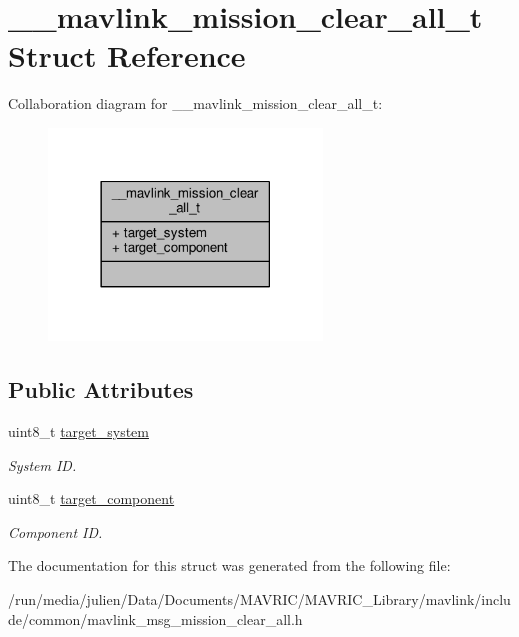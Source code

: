 \hypertarget{struct____mavlink__mission__clear__all__t}{\section{\+\_\+\+\_\+mavlink\+\_\+mission\+\_\+clear\+\_\+all\+\_\+t Struct Reference}
\label{struct____mavlink__mission__clear__all__t}
}


Collaboration diagram for \+\_\+\+\_\+mavlink\+\_\+mission\+\_\+clear\+\_\+all\+\_\+t\+:
\nopagebreak
\begin{figure}[H]
\begin{center}
\leavevmode
\includegraphics[width=206pt]{struct____mavlink__mission__clear__all__t__coll__graph}
\end{center}
\end{figure}
\subsection*{Public Attributes}
\begin{DoxyCompactItemize}
\item 
\hypertarget{struct____mavlink__mission__clear__all__t_ad628d39e2e099c3c1c015b15b7d4d150}{uint8\+\_\+t \hyperlink{struct____mavlink__mission__clear__all__t_ad628d39e2e099c3c1c015b15b7d4d150}{target\+\_\+system}}\label{struct____mavlink__mission__clear__all__t_ad628d39e2e099c3c1c015b15b7d4d150}

\begin{DoxyCompactList}\small\item\em System I\+D. \end{DoxyCompactList}\item 
\hypertarget{struct____mavlink__mission__clear__all__t_ac3e8927334773420a64fcd60202651f1}{uint8\+\_\+t \hyperlink{struct____mavlink__mission__clear__all__t_ac3e8927334773420a64fcd60202651f1}{target\+\_\+component}}\label{struct____mavlink__mission__clear__all__t_ac3e8927334773420a64fcd60202651f1}

\begin{DoxyCompactList}\small\item\em Component I\+D. \end{DoxyCompactList}\end{DoxyCompactItemize}


The documentation for this struct was generated from the following file\+:\begin{DoxyCompactItemize}
\item 
/run/media/julien/\+Data/\+Documents/\+M\+A\+V\+R\+I\+C/\+M\+A\+V\+R\+I\+C\+\_\+\+Library/mavlink/include/common/mavlink\+\_\+msg\+\_\+mission\+\_\+clear\+\_\+all.\+h\end{DoxyCompactItemize}
